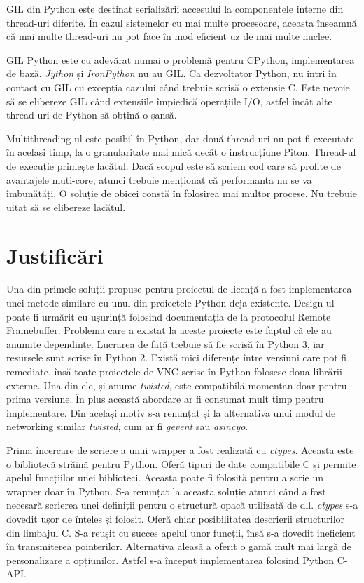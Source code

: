 GIL din Python este destinat serializării accesului la componentele interne din thread-uri diferite. În cazul sistemelor cu mai multe procesoare, aceasta înseamnă că mai multe thread-uri nu pot face în mod eficient uz de mai multe nuclee. 

GIL Python este cu adevărat numai o problemă pentru CPython, implementarea de bază. \textit{Jython} și \textit{IronPython} nu au GIL. Ca dezvoltator Python, nu intri în contact cu GIL cu excepția cazului când trebuie scrisă o extensie C. Este nevoie să se elibereze GIL când extensiile împiedică operațiile I/O, astfel încât alte thread-uri de Python să obțină o șansă.

Multithreading-ul este posibil în Python, dar două thread-uri nu pot fi executate în același timp, la o granularitate mai mică decât o instrucțiune Piton. Thread-ul de execuție primește lacătul. Dacă scopul este să scriem cod care să profite de avantajele muti-core, atunci trebuie menționat că performanța nu se va îmbunătăți. O soluție de obicei constă în folosirea mai multor procese. Nu trebuie uitat să se elibereze lacătul.


\section{Justificări}


Una din primele soluții propuse pentru proiectul de licență a fost implementarea unei metode similare cu unul din proiectele Python deja existente. Design-ul poate fi urmărit cu ușurință folosind documentația de la protocolul Remote Framebuffer. Problema care a existat la aceste proiecte este faptul că ele au anumite dependințe. Lucrarea de față trebuie să fie scrisă în Python 3, iar resursele sunt scrise în Python 2. Există mici diferențe între versiuni care pot fi remediate, însă toate proiectele de VNC scrise în Python folosesc doua librării externe. Una din ele, și anume \textit{twisted}, este compatibilă momentan doar pentru prima versiune. În plus această abordare ar fi consumat mult timp pentru implementare. Din același motiv s-a renunțat și la alternativa unui modul de networking similar \textit{twisted}, cum ar fi \textit{gevent} sau \textit{asincyo}.

Prima încercare de scriere a unui wrapper a fost realizată cu \textit{ctypes}. Aceasta este o bibliotecă străină pentru Python. Oferă tipuri de date compatibile C și permite apelul funcțiilor unei biblioteci. Aceasta poate fi folosită pentru a scrie un wrapper doar în Python. S-a renunțat la această soluție atunci când a fost necesară scrierea unei definiții pentru o structură opacă utilizată de dll. \textit{ctypes} s-a dovedit ușor de înțeles și folosit. Oferă chiar posibilitatea descrierii structurilor din limbajul C. S-a reușit cu succes apelul unor funcții, însă s-a dovedit ineficient în transmiterea pointerilor. Alternativa aleasă a oferit o gamă mult mai largă de personalizare a opțiunilor. Astfel s-a început implementarea folosind Python C-API.

